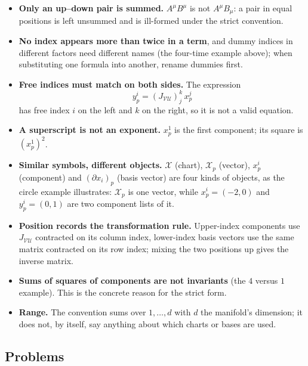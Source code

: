 \documentclass[11pt]{article}
\begin{document}
\begin{itemize}
  \item \textbf{Only an up--down pair is summed.} $A^\mu B^\mu$ is not $A^\mu B_\mu$: a pair in equal positions is left unsummed and is ill-formed under the strict convention.
  \item \textbf{No index appears more than twice in a term}, and dummy indices in different factors need different names (the four-time example above); when substituting one formula into another, rename dummies first.
  \item \textbf{Free indices must match on both sides.} The expression
  \[
  y^i_p=(J_{\mathcal{VU}})^k_j\,x^j_p
  \]
  has free index $i$ on the left and $k$ on the right, so it is not a valid equation.
  \item \textbf{A superscript is not an exponent.} $x^1_p$ is the first component; its square is $(x^1_p)^2$.
  \item \textbf{Similar symbols, different objects.} $\mathcal X$ (chart), $\mathcal X_p$ (vector), $x^i_p$ (component) and $(\partial x_i)_p$ (basis vector) are four kinds of objects, as the circle example illustrates: $\mathcal X_p$ is one vector, while $x^i_p=(-2,0)$ and $y^i_p=(0,1)$ are two component lists of it.
  \item \textbf{Position records the transformation rule.} Upper-index components use $J_{\mathcal{VU}}$ contracted on its column index, lower-index basis vectors use the same matrix contracted on its row index; mixing the two positions up gives the inverse matrix.
  \item \textbf{Sums of squares of components are not invariants} (the $4$ versus $1$ example). This is the concrete reason for the strict form.
  \item \textbf{Range.} The convention sums over $1,\dots,d$ with $d$ the manifold's dimension; it does not, by itself, say anything about which charts or bases are used.
\end{itemize}

\subsection*{Problems}
\end{document}
